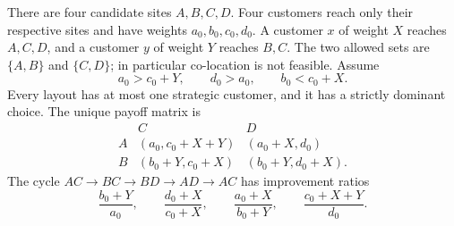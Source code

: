 \documentclass[11pt]{article}
\theoremstyle{definition}
\theoremstyle{remark}
\begin{document}
There are four candidate sites $A,B,C,D$. Four customers reach only their respective sites and have weights $a_0,b_0,c_0,d_0$. A customer $x$ of weight $X$ reaches $A,C,D$, and a customer $y$ of weight $Y$ reaches $B,C$. The two allowed sets are $\{A,B\}$ and $\{C,D\}$; in particular co-location is not feasible. Assume
\begin{equation}\label{eq:lower-conditions}
 a_0>c_0+Y,\qquad d_0>a_0,\qquad b_0<c_0+X.
\end{equation}
Every layout has at most one strategic customer, and it has a strictly dominant choice. The unique payoff matrix is
\[
\begin{array}{c|cc}
 &C&D\\ \hline
 A&(a_0,c_0+X+Y)&(a_0+X,d_0)\\
 B&(b_0+Y,c_0+X)&(b_0+Y,d_0+X).
\end{array}
\]
The cycle $AC\to BC\to BD\to AD\to AC$ has improvement ratios
\begin{equation}\label{eq:lower-ratios}
 \frac{b_0+Y}{a_0},\qquad
 \frac{d_0+X}{c_0+X},\qquad
 \frac{a_0+X}{b_0+Y},\qquad
 \frac{c_0+X+Y}{d_0}.
\end{equation}
\end{document}
